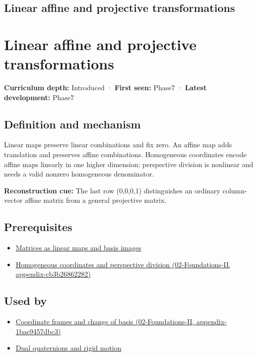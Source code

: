 \hypertarget{appendix-0bf0ca73f735}{}
\section*{Linear affine and projective transformations}
\chapter{Linear affine and projective transformations}\label{appendix-0bf0ca73f735-linear-affine-and-projective-transformations}

\textbf{Curriculum depth:} Introduced · \textbf{First seen:} Phase7 · \textbf{Latest development:} Phase7

\section{Definition and mechanism}\label{appendix-0bf0ca73f735-definition-and-mechanism}

Linear maps preserve linear combinations and fix zero. An affine map adds translation and preserves affine combinations. Homogeneous coordinates encode affine maps linearly in one higher dimension; perspective division is nonlinear and needs a valid nonzero homogeneous denominator.

\textbf{Reconstruction cue:} The last row (0,0,0,1) distinguishes an ordinary column-vector affine matrix from a general projective matrix.

\section{Prerequisites}\label{appendix-0bf0ca73f735-prerequisites}

\begin{itemize}
\tightlist
\item
  \hyperref[appendix-bd39c3bf5d64]{Matrices as linear maps and basis images}
\item
  \href{../02-Foundations-II/main.pdf\#nameddest=appendix-cb3b26862282}{Homogeneous coordinates and perspective division (02-Foundations-II, appendix-cb3b26862282)}
\end{itemize}

\section{Used by}\label{appendix-0bf0ca73f735-used-by}

\begin{itemize}
\tightlist
\item
  \href{../02-Foundations-II/main.pdf\#nameddest=appendix-1bae9457dbc3}{Coordinate frames and change of basis (02-Foundations-II, appendix-1bae9457dbc3)}
\item
  \hyperref[appendix-d1ea57347893]{Dual quaternions and rigid motion}
\end{itemize}

